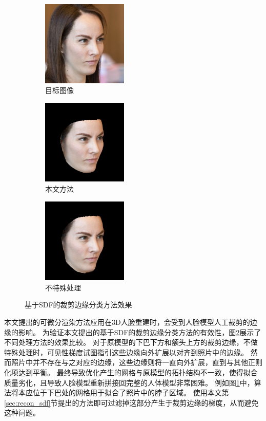 \begin{figure}
    \centering
    \begin{subfigure}{1.6in}
        \includegraphics[height=1.6in]{figures/diffrast_face/04114/target_hs}%
        \caption{目标图像}
    \end{subfigure}%
    \begin{subfigure}{1.6in}
        \includegraphics[height=1.6in]{figures/diffrast_face/04114/final_rerendered}%
        \caption{本文方法}
    \end{subfigure}%
    \begin{subfigure}{1.6in}
        \includegraphics[height=1.6in]{figures/diffrast_face/04114/no_sdf}%
        \caption{不特殊处理}
        \label{fig:edge_gradient_no_sdf}
\end{subfigure}%
    \caption{基于SDF的裁剪边缘分类方法效果}
    \label{fig:edge_gradient}
\end{figure}
本文提出的可微分渲染方法应用在3D人脸重建时，会受到人脸模型人工裁剪的边缘的影响。
为验证本文提出的基于SDF的裁剪边缘分类方法的有效性，图\ref{fig:edge_gradient}展示了不同处理方法的效果比较。
对于原模型的下巴下方和额头上方的裁剪边缘，不做特殊处理时，可见性梯度试图指引这些边缘向外扩展以对齐到照片中的边缘。
然而照片中并不存在与之对应的边缘，这些边缘则将一直向外扩展，直到与其他正则化项达到平衡。
最终导致优化产生的网格与原模型的拓扑结构不一致，使得拟合质量劣化，且导致人脸模型重新拼接回完整的人体模型非常困难。
例如图\ref{fig:edge_gradient_no_sdf}中，算法将本应位于下巴处的网格用于拟合了照片中的脖子区域。
使用本文第\ref{sec:recon_sdf}节提出的方法即可过滤掉这部分产生于裁剪边缘的梯度，从而避免这种问题。

